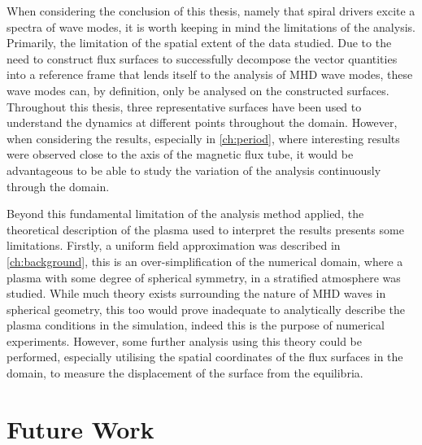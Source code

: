 \documentclass[a4paper,12pt,fourier,authoryear,custommargin]{Classes/PhDThesisPSnPDF}
\begin{document}
When considering the conclusion of this thesis, namely that spiral drivers excite a spectra of wave modes, it is worth keeping in mind the limitations of the analysis.
Primarily, the limitation of the spatial extent of the data studied.
Due to the need to construct flux surfaces to successfully decompose the vector quantities into a reference frame that lends itself to the analysis of MHD wave modes, these wave modes can, by definition, only be analysed on the constructed surfaces.
Throughout this thesis, three representative surfaces have been used to understand the dynamics at different points throughout the domain.
However, when considering the results, especially in \cref{ch:period}, where interesting results were observed close to the axis of the magnetic flux tube, it would be advantageous to be able to study the variation of the analysis continuously through the domain.

Beyond this fundamental limitation of the analysis method applied, the theoretical description of the plasma used to interpret the results presents some limitations.
Firstly, a uniform field approximation was described in \cref{ch:background}, this is an over-simplification of the numerical domain, where a plasma with some degree of spherical symmetry, in a stratified atmosphere was studied.
While much theory exists surrounding the nature of MHD waves in spherical geometry, this too would prove inadequate to analytically describe the plasma conditions in the simulation, indeed this is the purpose of numerical experiments.
However, some further analysis using this theory could be performed, especially utilising the spatial coordinates of the flux surfaces in the domain, to measure the displacement of the surface from the equilibria.

\section{Future Work}
\end{document}
